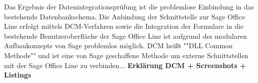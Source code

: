 Das Ergebnis der Datenintegrationsprüfung ist die problemlose Einbindung in das bestehende Datenbankschema. Die Anbindung der Schnittstelle zur Sage Office Line erfolgt mittels DCM-Verfahren sowie die Integration der Formulare in die bestehende Benutzeroberfläche der Sage Office Line ist aufgrund des modularen Aufbaukonzepts von Sage problemlos möglich. DCM heißt ""DLL Common Methode"" und ist eine von Sage geschaffene Methode um externe Schnittstellen mit der Sage Office Line zu verbinden... \textbf{Erklärung DCM + Screenshots + Listings}